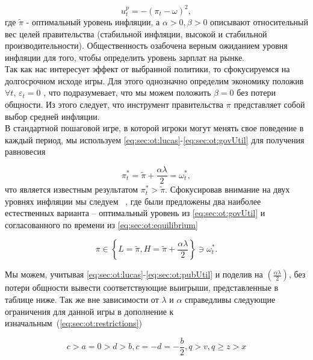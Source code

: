 \begin{equation}
\label{eq:sec:ot:pubUtil}
u^p_t=-(\pi_t - \omega)^2,
\end{equation}
где $\tilde{\pi}$ - оптимальный уровень инфляции, а $\alpha > 0, \beta > 0$ описывают относительный вес целей правительства (стабильной инфляции, высокой и стабильной производительности). Общественность озабочена верным ожиданием уровня инфляции для того, чтобы определить уровень зарплат на рынке. 
\\

Так как нас интересует эффект от выбранной политики, то сфокусируемся на долгосрочном исходе игры. Для этого однозначно определим экономику положив $\forall t$,      $\varepsilon_t=0$ , что подразумевает, что мы можем положить $\beta=0$ без потери общности. Из этого следует, что инструмент правительства $\pi$  представляет собой выбор средней инфляции.
\\

В стандартной пошаговой игре, в которой игроки могут менять свое поведение в каждый период, мы используем \eqref{eq:sec:ot:lucas}-\eqref{eq:sec:ot:govUtil} для получения равновесия

\begin{equation}
\label{eq:sec:ot:equilibrium}
\pi^*_t= \tilde{\pi} + \frac{\alpha\lambda}{2}= \omega^*_t,
\end{equation}
что является известным результатом $\pi^*_t > \tilde{\pi}$. Сфокусировав внимание на двух уровнях инфляции мы следуем  ~\cite{ChoiAndMacui96InflationFinancialMarkets}, где были предложены два наиболее естественных варианта – оптимальный уровень из \eqref{eq:sec:ot:govUtil} и согласованного по времени из \eqref{eq:sec:ot:equilibrium}

\begin{equation}
\label{eq:sec:ot:optimal}
\pi \in \left\{L=\tilde{\pi}, H=\tilde{\pi}+\frac{\alpha\lambda}{2} \right\} \ni \omega^*_t.
\end{equation}

Мы можем, учитывая \eqref{eq:sec:ot:lucas}-\eqref{eq:sec:ot:pubUtil} и поделив на $\left(\frac{\alpha\lambda}{2}\right)$,  без потери общности вывести соответствующие выигрыши, представленные в таблице ниже. Так же вне зависимости от $\lambda$ и  $\alpha$ справедливы следующие ограничения для данной игры в дополнение к изначальным~(\ref{eq:sec:ot:restrictions})

\begin{equation}
	\label{eq:sec:ot:constraint}
	c>a=0 > d > b,c=-d=-\frac{b}{2}, q>v,q\geqslant z>x
\end{equation}

